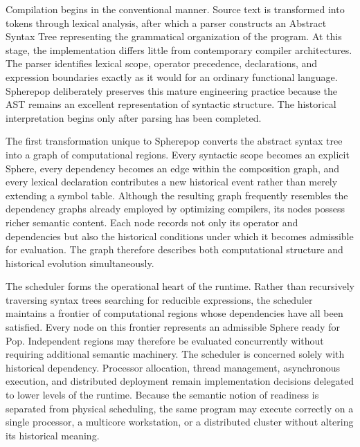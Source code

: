 \documentclass[12pt,oneside]{article}
\theoremstyle{definition}
\theoremstyle{remark}
\begin{document}
Compilation begins in the conventional manner. Source text is transformed into
tokens through lexical analysis, after which a parser constructs an Abstract
Syntax Tree representing the grammatical organization of the program. At this
stage, the implementation differs little from contemporary compiler
architectures. The parser identifies lexical scope, operator precedence,
declarations, and expression boundaries exactly as it would for an ordinary
functional language. Spherepop deliberately preserves this mature engineering
practice because the AST remains an excellent representation of syntactic
structure. The historical interpretation begins only after parsing has been
completed.

The first transformation unique to Spherepop converts the abstract syntax tree
into a graph of computational regions. Every syntactic scope becomes an
explicit Sphere, every dependency becomes an edge within the composition
graph, and every lexical declaration contributes a new historical event rather
than merely extending a symbol table. Although the resulting graph frequently
resembles the dependency graphs already employed by optimizing compilers, its
nodes possess richer semantic content. Each node records not only its operator
and dependencies but also the historical conditions under which it becomes
admissible for evaluation. The graph therefore describes both computational
structure and historical evolution simultaneously.

The scheduler forms the operational heart of the runtime. Rather than
recursively traversing syntax trees searching for reducible expressions, the
scheduler maintains a frontier of computational regions whose dependencies
have all been satisfied. Every node on this frontier represents an admissible
Sphere ready for Pop. Independent regions may therefore be evaluated
concurrently without requiring additional semantic machinery. The scheduler is
concerned solely with historical dependency. Processor allocation, thread
management, asynchronous execution, and distributed deployment remain
implementation decisions delegated to lower levels of the runtime. Because the
semantic notion of readiness is separated from physical scheduling, the same
program may execute correctly on a single processor, a multicore workstation,
or a distributed cluster without altering its historical meaning.
\end{document}
